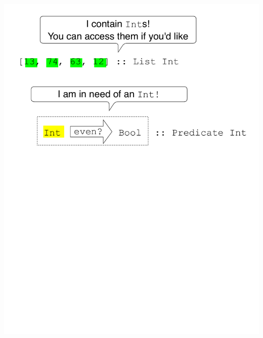 \documentclass[UKenglish,usenames,dvipsnames,svgnames,table,aspectratio=169,mathserif]{beamer}
\newcommand{\nega}[1]{\colorbox{yellow}{#1}}
\newcommand{\posi}[1]{\colorbox{green}{#1}}
\newcommand{\nl}{\vspace{\baselineskip}}
\newcommand{\pnl}{\pause \nl}
\begin{document}
\begin{frame}
\includegraphics[scale=0.7]{contravariant-want-as2.pdf}
\end{frame}





\end{document}
